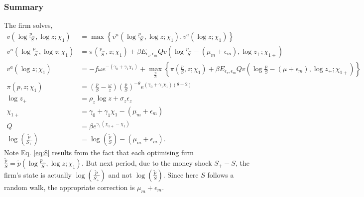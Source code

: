 \subsubsection*{Summary}
The firm solves,
\begin{align}
    \label{eq:1}
    v\left( \log \frac{p_-}{S}, \log z; \chi_1 \right) &= \max \left\{v^n\left( \log \frac{p_-}{S}, \log z; \chi_1\right), v^a (\log z; \chi_1) \right\}\\ \label{eq:2}
    v^n\left(\log\frac{p_-}{S}, \log z; \chi_1\right) &= \pi\left( \frac{p_-}{S}, z; \chi_1\right) + \beta E_{\epsilon_z, \epsilon_m} Q v\left( \log \frac{p_-}{S} - (\mu_m + \epsilon_m), \log z_+; \chi_{1+} \right) \\ \label{eq:3}
    v^a\left(\log z; \chi_1\right) &= - f \omega e^{-(\gamma_0 + \gamma_1 \chi_1)} + \max_{\frac{p}{S}} \left\{ \pi\left( \frac{p}{S}, z; \chi_1 \right) + \beta E_{\epsilon_z, \epsilon_m} Q v\left(\log \frac{p}{S} - (\mu + \epsilon_m), \log z_+; \chi_{1+} \right) \right\}\\ \label{eq:4}
    \pi(p, z; \chi_1) &= \left(\frac{p}{S} - \frac{\omega}{z}\right) \left(\frac{p }{S}\right)^{-\theta} e^{(\gamma_0 + \gamma_1\chi_1)(\theta - 2)}\\ \label{eq:5}
    \log z_+ &= \rho_z \log z + \sigma_z \epsilon_z \\ \label{eq:6}
    \chi_{1+} &= \gamma_0 + \gamma_1 \chi_1 - (\mu_m + \epsilon_m) \\ \label{eq:7}
    Q &= \beta e^{\gamma_1(\chi_{1+} - \chi_1)} \\ \label{eq:8}
    \log\left(\frac{\tilde p}{S_+}\right) &= \log\left(\frac{\tilde p}{S}\right) - (\mu_m + \epsilon_m).
\end{align}
Note Eq. \eqref{eq:8} results from the fact that each optimising firm $\frac{\tilde p}{S} = \tilde p\left( \log \frac{p_-}{S}, \log z; \chi_1 \right)$. But next period, due to the money shock $S_+ - S$, the firm's state is actually $\log\left(\frac{\tilde p}{S_+}\right)$ and not $\log\left(\frac{\tilde p}{S}\right)$. Since here $S$ follows a random walk, the appropriate correction is $\mu_m + \epsilon_m$.
